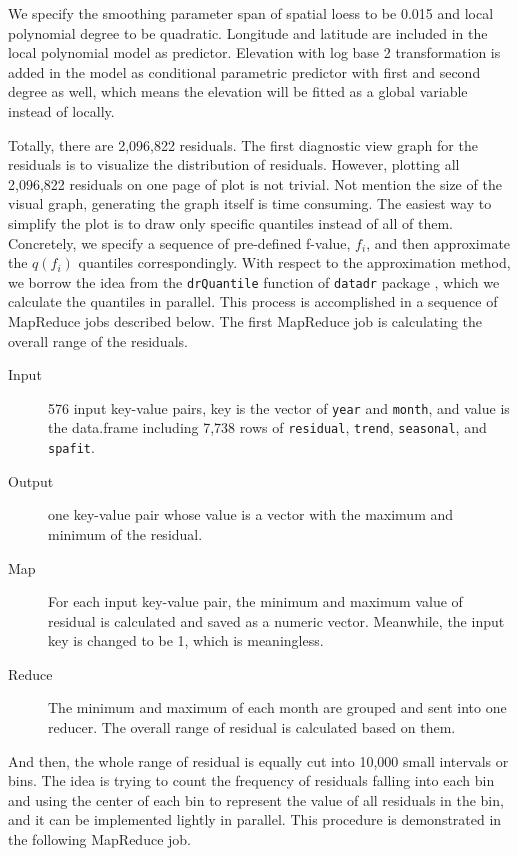 We specify the smoothing parameter span of spatial loess to be 0.015 and local
polynomial degree to be quadratic. Longitude and latitude are included in the 
local polynomial model as predictor. Elevation with log base 2 transformation is
added in the model as conditional parametric predictor with first and second 
degree as well, which means the elevation will be fitted as a global variable 
instead of locally. 

Totally, there are 2,096,822 residuals. The first diagnostic view graph for the
residuals is to visualize the distribution of residuals. 
However, plotting all 2,096,822 residuals on one page of plot is not trivial. Not
mention the size of the visual graph, generating the graph itself is time 
consuming. The easiest way to simplify the plot is to draw only specific quantiles
instead of all of them. Concretely, we specify a sequence of pre-defined f-value,
$f_i$, and then approximate the $q(f_i)$ quantiles correspondingly. With respect
to the approximation method, we borrow the idea from the \texttt{drQuantile} 
function of \texttt{datadr} package \cite{datadr}, which we calculate the quantiles
in parallel. This process is accomplished in a sequence of MapReduce jobs described 
below. The first MapReduce job is calculating the overall range of the residuals.

\begin{description}
  \item[Input] 576 input key-value pairs, key is the vector of \texttt{year} and
  \texttt{month}, and value is the data.frame including 7,738 rows of 
  \texttt{residual}, \texttt{trend}, \texttt{seasonal}, and \texttt{spafit}.
  \item[Output] one key-value pair whose value is a vector with the maximum and
  minimum of the residual.
  \item[Map] For each input key-value pair, the minimum and maximum value of 
  residual is calculated and saved as a numeric vector. Meanwhile, the input
  key is changed to be 1, which is meaningless.
  \item[Reduce] The minimum and maximum of each month are grouped and sent into
  one reducer. The overall range of residual is calculated based on them.
\end{description}

And then, the whole range of residual is equally cut into 10,000 small intervals 
or bins. The idea is trying to count the frequency of residuals falling into each
bin and using the center of each bin to represent the value of all residuals in
the bin, and it can be implemented lightly in parallel. This procedure is 
demonstrated in the following MapReduce job.

